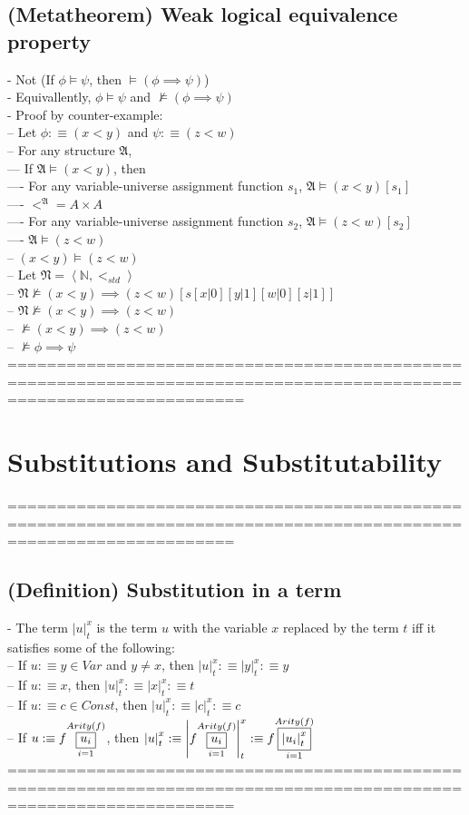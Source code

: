 \documentclass{book}
\newcommand{\is}{:\equiv}
\newcommand{\inot}{\not}
\newcommand{\means}[2]{#1^{#2}}
\newcommand{\seq}[1]{\left\langle #1 \right\rangle}
\newcommand{\vdc}[3]{\underset{#2}{\overset{#3}{\fbox{$#1$}}}}
\newcommand{\sub}[3]{\left|#1\right|_{#3}^{#2}}
\begin{document}
\subsection{(Metatheorem) Weak logical equivalence property} %
	- Not (If $\phi \vDash \psi$, then $\vDash (\phi \implies \psi)$) \\
	- Equivallently, $\phi \vDash \psi$ and $\inot \vDash (\phi \implies \psi)$ \\
	- Proof by counter-example: \\
		-- Let $\phi \is (x < y)$ and $\psi \is (z < w)$ \\
		-- For any structure $\mathfrak{A}$, \\
			--- If $\mathfrak{A} \vDash (x < y)$, then \\
				----	For any variable-universe assignment function $s_1$, $\mathfrak{A} \vDash (x < y)[s_1]$ \\
				---- $\means{<}{\mathfrak{A}} = A \times A$ \\
				---- For any variable-universe assignment function $s_2$, $\mathfrak{A} \vDash (z < w)[s_2]$ \\
				---- $\mathfrak{A} \vDash (z < w)$ \\
		-- $(x < y) \vDash (z < w)$ \\
		-- Let $\mathfrak{N} = \seq{\mathbb{N}, <_{std}}$ \\
		-- $\mathfrak{N} \inot \vDash (x < y) \implies (z < w)[s[x|0][y|1][w|0][z|1]]$ \\
		-- $\mathfrak{N} \inot \vDash (x < y) \implies (z < w)$ \\
		-- $\inot \vDash (x < y) \implies (z < w)$ \\
		-- $\inot \vDash \phi \implies \psi$ \\
	====================================================================================================================

\section{Substitutions and Substitutability}
	===================================================================================================================
\subsection{(Definition) Substitution in a term} %
	- The term $\sub{u}{x}{t}$ is the term $u$ with the variable $x$ replaced by the term $t$ iff it satisfies some of the following: \\
		-- If $u \is y \in Var$ and $y \neq x$, then $\sub{u}{x}{t} \is \sub{y}{x}{t} \is y$ \\
		-- If $u \is x$, then $\sub{u}{x}{t} \is \sub{x}{x}{t} \is t$ \\
		-- If $u \is c \in Const$, then $\sub{u}{x}{t} \is \sub{c}{x}{t} \is c$ \\
		-- If $u \is f \vdc{u_i}{i=1}{Arity(f)}$, then $\sub{u}{x}{t} \is \sub{f \vdc{u_i}{i=1}{Arity(f)}}{x}{t} \is f \vdc{\sub{u_i}{x}{t}}{i=1}{Arity(f)}$ \\
	===================================================================================================================
\end{document}
